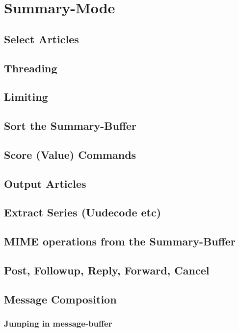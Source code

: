 \documentclass{article}
\begin{document}
\section*{Summary-Mode}
\SummaryModeGeneral
    \subsection*{Select Articles}
    \SelectArticles
%
    \subsection*{Threading}
    \Threading
%
    \subsection*{Limiting}
    \Limiting
    \subsection*{Sort the Summary-Buffer}
    \SortSummary
    \subsection*{Score (Value) Commands}
    \Scoring
    \subsection*{Output Articles}
    \OutputArticles
    \subsection*{Extract Series (Uudecode etc)}
    \ExtractSeries
    \subsection*{MIME operations from the Summary-Buffer}
    \MIMESummary     
%
    \subsection*{Post, Followup, Reply, Forward, Cancel}
    \PostReplyetc
    \newpage
      \subsection*{Message Composition}
      \MsgCompositionGeneral
        \subsubsection*{Jumping in message-buffer}
        \MsgCompositionMovementArticle
\end{document}
